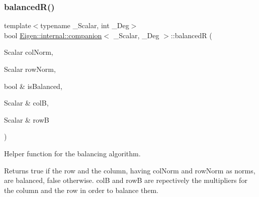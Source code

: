 \mbox{\label{class_eigen_1_1internal_1_1companion_a9945fcaca89aecc2fbff0e9b06510de0}} 
\subsubsection{\texorpdfstring{balanced\+R()}{balancedR()}\hspace{0.1cm}{\footnotesize\ttfamily [1/2]}}
{\footnotesize\ttfamily template$<$typename \+\_\+\+Scalar, int \+\_\+\+Deg$>$ \\
bool \hyperlink{class_eigen_1_1internal_1_1companion}{Eigen\+::internal\+::companion}$<$ \+\_\+\+Scalar, \+\_\+\+Deg $>$\+::balancedR (\begin{DoxyParamCaption}\item[{Scalar}]{col\+Norm,  }\item[{Scalar}]{row\+Norm,  }\item[{bool \&}]{is\+Balanced,  }\item[{Scalar \&}]{colB,  }\item[{Scalar \&}]{rowB }\end{DoxyParamCaption})\hspace{0.3cm}{\ttfamily [protected]}}

Helper function for the balancing algorithm. \begin{DoxyReturn}{Returns}
true if the row and the column, having col\+Norm and row\+Norm as norms, are balanced, false otherwise. colB and rowB are repectively the multipliers for the column and the row in order to balance them. 
\end{DoxyReturn}
\mbox{\label{class_eigen_1_1internal_1_1companion_a9945fcaca89aecc2fbff0e9b06510de0}} 
